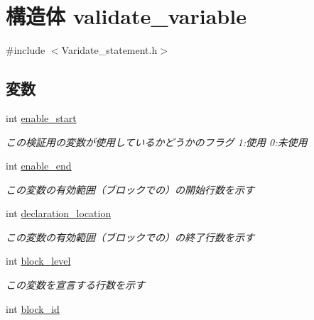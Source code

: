 \section{構造体 validate\_\-variable}
\label{structvalidate__variable}


{\ttfamily \#include $<$Varidate\_\-statement.h$>$}

\subsection*{変数}
\begin{DoxyCompactItemize}
\item 
int \hyperlink{structvalidate__variable_a5c45828cb643023cfd27baff775c0acf}{enable\_\-start}\label{structvalidate__variable_a5c45828cb643023cfd27baff775c0acf}

\begin{DoxyCompactList}\small\item\em この検証用の変数が使用しているかどうかのフラグ 1:使用 0:未使用 \item\end{DoxyCompactList}\item 
int \hyperlink{structvalidate__variable_a95b3e1941730e028e9c2878f93656dc3}{enable\_\-end}\label{structvalidate__variable_a95b3e1941730e028e9c2878f93656dc3}

\begin{DoxyCompactList}\small\item\em この変数の有効範囲（ブロックでの）の開始行数を示す \item\end{DoxyCompactList}\item 
int \hyperlink{structvalidate__variable_aa13526c1c33b126cf8a5da5c96cdfeef}{declaration\_\-location}\label{structvalidate__variable_aa13526c1c33b126cf8a5da5c96cdfeef}

\begin{DoxyCompactList}\small\item\em この変数の有効範囲（ブロックでの）の終了行数を示す \item\end{DoxyCompactList}\item 
int \hyperlink{structvalidate__variable_a92692a6ba8c228191546f6d99082f829}{block\_\-level}\label{structvalidate__variable_a92692a6ba8c228191546f6d99082f829}

\begin{DoxyCompactList}\small\item\em この変数を宣言する行数を示す \item\end{DoxyCompactList}\item 
int \hyperlink{structvalidate__variable_a8f7988fadcaa504338c997c60b1b3674}{block\_\-id}\label{structvalidate__variable_a8f7988fadcaa504338c997c60b1b3674}


\end{DoxyCompactItemize}
